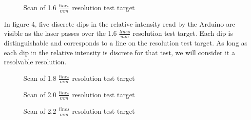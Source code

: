 \documentclass[letterpaper, 12pt]{article}
\begin{document}
  \dataone
\begin{figure}[H]
  \centering
  \caption[caption]{Scan of 1.6 $\frac{lines}{mm}$ resolution test target}
\end{figure}

\par
In figure 4, five discrete dips in the relative intensity read by the Arduino are visible as the laser passes over the 1.6 $\frac{lines}{mm}$ resolution test target. Each dip is distinguishable and corresponds to a line on the resolution test target. As long as each dip in the relative intensity is discrete for that test, we will consider it a resolvable resolution.

  \datatwo
\begin{figure}[H]
  \centering
  \caption[caption]{Scan of 1.8 $\frac{lines}{mm}$ resolution test target}
\end{figure}

  \datathree
\begin{figure}[H]
  \centering
  \caption[caption]{Scan of 2.0 $\frac{lines}{mm}$ resolution test target}
\end{figure}

  \datathree
\begin{figure}[H]
  \centering
  \caption[caption]{Scan of 2.2 $\frac{lines}{mm}$ resolution test target}
\end{figure}
\end{document}
